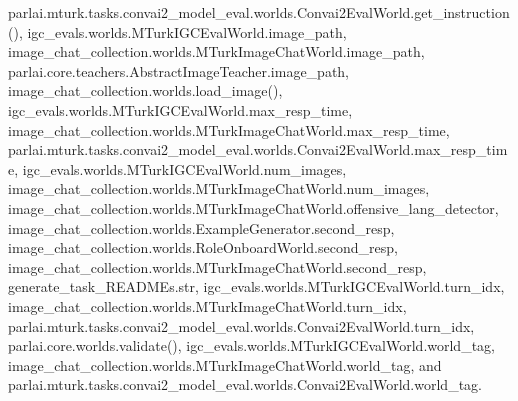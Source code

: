 parlai.\+mturk.\+tasks.\+convai2\+\_\+model\+\_\+eval.\+worlds.\+Convai2\+Eval\+World.\+get\+\_\+instruction(), igc\+\_\+evals.\+worlds.\+M\+Turk\+I\+G\+C\+Eval\+World.\+image\+\_\+path, image\+\_\+chat\+\_\+collection.\+worlds.\+M\+Turk\+Image\+Chat\+World.\+image\+\_\+path, parlai.\+core.\+teachers.\+Abstract\+Image\+Teacher.\+image\+\_\+path, image\+\_\+chat\+\_\+collection.\+worlds.\+load\+\_\+image(), igc\+\_\+evals.\+worlds.\+M\+Turk\+I\+G\+C\+Eval\+World.\+max\+\_\+resp\+\_\+time, image\+\_\+chat\+\_\+collection.\+worlds.\+M\+Turk\+Image\+Chat\+World.\+max\+\_\+resp\+\_\+time, parlai.\+mturk.\+tasks.\+convai2\+\_\+model\+\_\+eval.\+worlds.\+Convai2\+Eval\+World.\+max\+\_\+resp\+\_\+time, igc\+\_\+evals.\+worlds.\+M\+Turk\+I\+G\+C\+Eval\+World.\+num\+\_\+images, image\+\_\+chat\+\_\+collection.\+worlds.\+M\+Turk\+Image\+Chat\+World.\+num\+\_\+images, image\+\_\+chat\+\_\+collection.\+worlds.\+M\+Turk\+Image\+Chat\+World.\+offensive\+\_\+lang\+\_\+detector, image\+\_\+chat\+\_\+collection.\+worlds.\+Example\+Generator.\+second\+\_\+resp, image\+\_\+chat\+\_\+collection.\+worlds.\+Role\+Onboard\+World.\+second\+\_\+resp, image\+\_\+chat\+\_\+collection.\+worlds.\+M\+Turk\+Image\+Chat\+World.\+second\+\_\+resp, generate\+\_\+task\+\_\+\+R\+E\+A\+D\+M\+Es.\+str, igc\+\_\+evals.\+worlds.\+M\+Turk\+I\+G\+C\+Eval\+World.\+turn\+\_\+idx, image\+\_\+chat\+\_\+collection.\+worlds.\+M\+Turk\+Image\+Chat\+World.\+turn\+\_\+idx, parlai.\+mturk.\+tasks.\+convai2\+\_\+model\+\_\+eval.\+worlds.\+Convai2\+Eval\+World.\+turn\+\_\+idx, parlai.\+core.\+worlds.\+validate(), igc\+\_\+evals.\+worlds.\+M\+Turk\+I\+G\+C\+Eval\+World.\+world\+\_\+tag, image\+\_\+chat\+\_\+collection.\+worlds.\+M\+Turk\+Image\+Chat\+World.\+world\+\_\+tag, and parlai.\+mturk.\+tasks.\+convai2\+\_\+model\+\_\+eval.\+worlds.\+Convai2\+Eval\+World.\+world\+\_\+tag.

